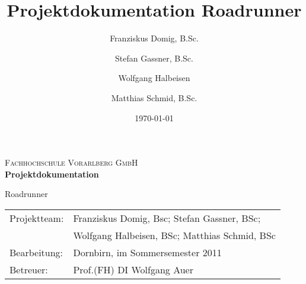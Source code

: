 \documentclass[11pt,a4paper]{article}
\title{Projektdokumentation Roadrunner}
\author{
	Franziskus Domig, B.Sc.\\
		\and
	Stefan Gassner, B.Sc.\\
		\and
	Wolfgang Halbeisen\\
		\and
	Matthias Schmid, B.Sc.\\	
}
\date{\today}
\begin{document}

\pagestyle{empty} %

\begin{center}
\textsc{Fachhochschule Vorarlberg GmbH}\\

\vspace{5cm}
{\large\textbf{Projektdokumentation}}\vspace{.5cm}

{\LARGE Roadrunner}

\end{center}

\vspace{14cm}


\begin{tabular}{ll}
Projektteam: & Franziskus Domig, Bsc; Stefan Gassner, BSc;\\
	     & Wolfgang Halbeisen, BSc; Matthias Schmid, BSc\\
Bearbeitung: & Dornbirn, im Sommersemester 2011\\
Betreuer:    & Prof.(FH) DI Wolfgang Auer\\
\end{tabular}


\clearpage
\pagestyle{fancy}
\setcounter{page}{1}

\tableofcontents


\clearpage
{}
\setcounter{page}{1}
\fancyfoot[CO]{\thepage}



\clearpage


\clearpage


\clearpage


\clearpage


\clearpage


\clearpage


\clearpage


\clearpage


\clearpage


\clearpage


\clearpage



\cleardoublepage



\fancyhead[R]{} %
\end{document}
